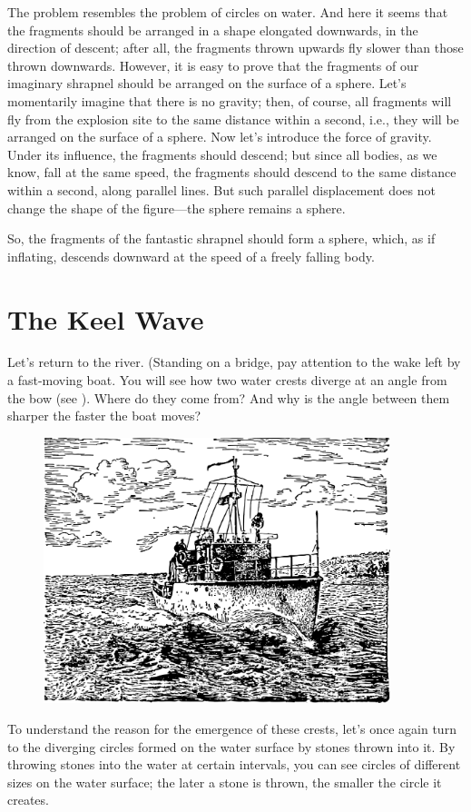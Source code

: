 \ans The problem resembles the problem of circles on water. And here it seems that the fragments should be arranged in a shape elongated downwards, in the direction of descent; after all, the fragments thrown upwards fly slower than those thrown downwards. However, it is easy to prove that the fragments of our imaginary shrapnel should be arranged on the surface of a sphere. Let's momentarily imagine that there is no gravity; then, of course, all fragments will fly from the explosion site to the same distance within a second, i.e., they will be arranged on the surface of a sphere. Now let's introduce the force of gravity. Under its influence, the fragments should descend; but since all bodies, as we know, fall at the same speed, the fragments should descend to the same distance within a second, along parallel lines. But such parallel displacement does not change the shape of the figure—the sphere remains a sphere.

So, the fragments of the fantastic shrapnel should form a sphere, which, as if inflating, descends downward at the speed of a freely falling body.

\section{The Keel Wave}
\label{sec-2.13}

Let's return to the river. (Standing on a bridge, pay attention to the wake left by a fast-moving boat. You will see how two water crests diverge at an angle from the bow (see ). Where do they come from? And why is the angle between them sharper the faster the boat moves?

\begin{figure}[h!]
\centering
\includegraphics[width=0.9\textwidth]{figures/ch-02/fig-048.pdf}
\end{figure}
To understand the reason for the emergence of these crests, let's once again turn to the diverging circles formed on the water surface by stones thrown into it. By throwing stones into the water at certain intervals, you can see circles of different sizes on the water surface; the later a stone is thrown, the smaller the circle it creates. 

